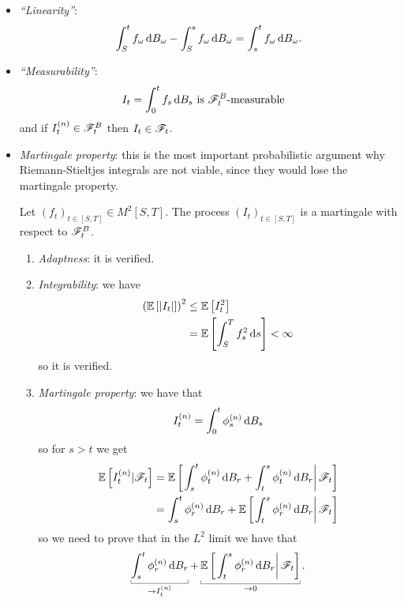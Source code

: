 \documentclass[12pt]{report}
\begin{document}
\begin{itemize}
	\item \emph{``Linearity''}:
	\begin{equation*}
		\int_{S}^{t}f_{\omega}\mathop{}\!\mathrm{d} B_{\omega}-\int_{S}^{s}f_{\omega}\mathop{}\!\mathrm{d} B_{\omega}=\int_{s}^{t}f_{\omega}\mathop{}\!\mathrm{d} B_{\omega}.
	\end{equation*}
	\item \emph{``Measurability''}:
	\begin{align*}
		I_{t}&=\int_{0}^{t}f_{s}\mathop{}\!\mathrm{d} B_{s}\text{ is $\mathscr{F}^{B}_{t}$-measurable}
	\end{align*}
	and if $I_{t}^{(n)}\in\mathscr{F}^{B}_{t}$ then $I_{t}\in\mathscr{F}_{t}$.
	\item \emph{Martingale property}: this is the most important probabilistic argument why Riemann-Stieltjes integrals are not viable, since they would lose the martingale property.
	\begin{theorem}
		Let ${\left(f_{t}\right)}_{t\in[S,T]}\in M^{2}[S,T]$. The process ${\left(I_{t}\right)}_{t\in[S,T]}$ is a martingale with respect to $\mathscr{F}^{B}_{t}$.
	\end{theorem}
	\begin{fancyproof}
		\begin{enumerate}[\circnum]
			\item \textit{Adaptness}: it is verified. \hfill\faCheckCircle[regular]
			\item \textit{Integrability}: we have
			\begin{align*}
				\left(\mathbb{E}\left[|I_{t}|\right]\right)^{2}&\leq\mathbb{E}\left[I^{2}_{t}\right]\\
				&=\mathbb{E}\left[\int_{S}^{T}f^{2}_{s}\mathop{}\!\mathrm{d} s\right]<\infty
			\end{align*}
			so it is verified.\hfill\faCheckCircle[regular]
			\item \textit{Martingale property}: we have that 
			\begin{equation*}
				I^{(n)}_{t}=\int_{0}^{t}\phi^{(n)}_{s}\mathop{}\!\mathrm{d} B_{s}
			\end{equation*}
			so for $s>t$ we get
			\begin{align*}
				\mathbb{E}\left[I^{(n)}_{t}|\mathscr{F}_{t}\right]&=\mathbb{E}\left[\left.\int_{s}^{t}\phi^{(n)}_{t}\mathop{}\!\mathrm{d} B_{r}+\int_{t}^{s}\phi^{(n)}_{t}\mathop{}\!\mathrm{d} B_{r}\right|\mathscr{F}_{t}\right]\\
				&=\int_{s}^{t}\phi^{(n)}_{r}\mathop{}\!\mathrm{d} B_{r}+\mathbb{E}\left[\left.\int_{t}^{s}\phi^{(n)}_{r}\mathop{}\!\mathrm{d} B_{r}\right|\mathscr{F}_{t}\right]
			\end{align*}
			so we need to prove that in the $L^{2}$ limit we have that 
			\begin{equation*}
				\ubracketthin{\int_{s}^{t}\phi^{(n)}_{r}\dif B_{r}}_{\to I^{(n)}_{t}}+\ubracketthin{\ev{\left.\int_{t}^{s}\phi^{(n)}_{r}\dif B_{r}\right|\F_{t}}}_{\to0}.

\end{equation*}
\end{enumerate}
\end{fancyproof}
\end{itemize}
\end{document}

